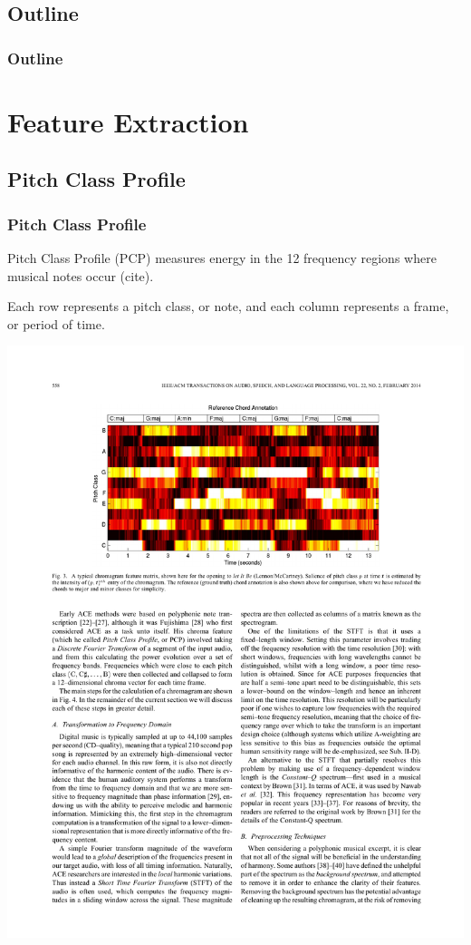 \documentclass{beamer}
\newcommand{\linespace}{\vskip 0.25cm}
\begin{document}
\subsection*{Outline}

\begin{frame}
  \frametitle{Outline}
  \tableofcontents[hideallsubsections]
\end{frame}


\section[Feature Extraction]{Feature Extraction}

\subsection{Pitch Class Profile}

\begin{frame}
  \frametitle{Pitch Class Profile}
  
Pitch Class Profile (PCP) measures energy in the 12 frequency regions where musical notes occur (cite).



\linespace
 
Each row represents a pitch class, or note, and each column represents a frame, or period of time.
 \begin{center}
   \includegraphics[width=.8\textwidth]{fig4.pdf}
 \end{center}

\end{frame}
\end{document}
